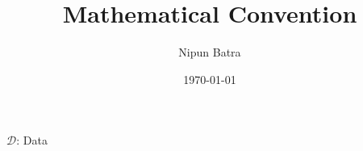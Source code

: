 \documentclass{beamer}
\title{Mathematical Convention}
\date{\today}
\author{Nipun Batra}
\institute{IIT Gandhinagar}
\newcommand{\data}{\mathcal{D}}
\begin{document}
  \maketitle
  
  
  
\begin{frame}
$\data$: Data
\end{frame}
\end{document}
